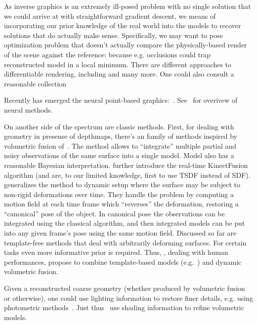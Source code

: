 As inverse graphics is an extremely ill-posed problem with no single solution
that we could arrive at with straightforward gradient descent, we means of
incorporating our prior knowledge of the real world into the models to recover
solutions that do actually make sense. Specifically, we may want to pose
optimization problem that doesn't actually compare the physically-based render
of the scene against the reference: because e.g. occlusions could trap
reconstructed model in a local minimum. There are different approaches to
differentiable rendering, including \citet{softras,dibR} and many more.
One could also consult a reasonable collection~\cite{kaolin}

Recently has emerged the neural point-based graphics:~\citet{npbg}.
See~\citet{neuralRenderingOverview} for overivew of neural methods.

On another side of the spectrum are classic methods. First, for dealing with
geometry in presense of depthmaps, there's an family of methods inspired by
volumetric fusion of~\citet{sdfFusion}. The method allows to ``integrate''
multiple partial and noisy observations of the same surface into a single
model.  Model also has a reasonable Bayesian interpretation.
\citet{kinectfusion} further introduce the real-time KinectFusion algorithm
(and are, to our limited knowledge, first to use TSDF instead of SDF).
\citet{dynamicfusion} generalizes the method to dynamic setup
where the surface may be subject to non-rigid deformations over time.
They handle the problem by computing a motion field at each time frame
which ``reverses'' the deformation, restoring a ``canonical'' pose
of the object. In canonical pose the observations can be integrated using
the classical algorithm, and then integrated models can be put into
any given frame's pose using the same motion field.
Discussed so far are template-free methods that deal with arbitrarily deforming
surfaces. For certain tasks even more informative prior is required.
Thus, \citet{doublefusion}, dealing with human performances, propose to combine
template-based models (e.g.~\citet{smpl,softsmpl}) and dynamic volumetric
fusion.

Given a reconstructed coarse geometry (whether produced by volumetric fusion or
otherwise), one could use lighting information to restore finer details, e.g.
using photometric methods~\citet{flashmob}. Just thus~\citet{shadingRefinedSDF}
use shading information to refine volumetric models.

